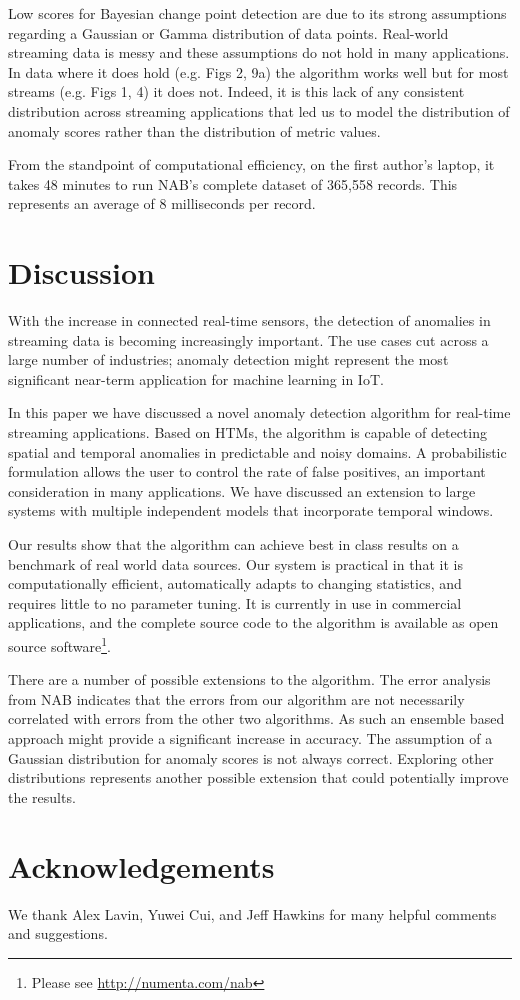 \documentclass{article}
\begin{document}
Low scores for Bayesian change point detection are due to its strong
assumptions regarding a Gaussian or Gamma distribution of data points.
Real-world streaming data is messy and these assumptions do not hold in many
applications. In data where it does hold (e.g. Figs 2, 9a) the algorithm works
well but for most streams (e.g. Figs 1, 4) it does not. Indeed, it is this lack
of any consistent distribution across streaming applications that led us to
model the distribution of anomaly scores rather than the distribution of metric
values.



From the standpoint of computational efficiency, on the first author's laptop,
it takes 48 minutes to run NAB's complete dataset of 365,558 records. This
represents an average of 8 milliseconds per record.

\section{Discussion}

With the increase in connected real-time sensors, the detection of anomalies in
streaming data is becoming increasingly important. The use cases cut across a
large number of industries; anomaly detection might represent the most
significant near-term application for machine learning in IoT.

In this paper we have discussed a novel anomaly detection algorithm for real-time
streaming applications. Based on HTMs, the algorithm is capable of detecting
spatial and temporal anomalies in predictable and noisy domains. A probabilistic
formulation allows the user to control the rate of false positives, an important
consideration in many applications. We have discussed an extension to large
systems with multiple independent models that incorporate temporal windows.

Our results show that the algorithm can achieve best in class results on a
benchmark of real world data sources. Our system is practical in that it is
computationally efficient, automatically adapts to changing statistics, and
requires little to no parameter tuning. It is currently in use in commercial
applications, and the complete source code to the algorithm is available as open
source software\footnote{Please see \url{http://numenta.com/nab}}.

There are a number of possible extensions to the algorithm. The error
analysis from NAB indicates that the errors from our algorithm are not
necessarily correlated with errors from the other two algorithms. As such an
ensemble based approach might provide a significant increase in accuracy.
The assumption of a Gaussian distribution for anomaly scores is not
always correct. Exploring other distributions represents another possible
extension that could potentially improve the results.

\section*{Acknowledgements} 
 
We thank Alex Lavin, Yuwei Cui, and Jeff Hawkins for many helpful comments
and suggestions.




\end{document}
